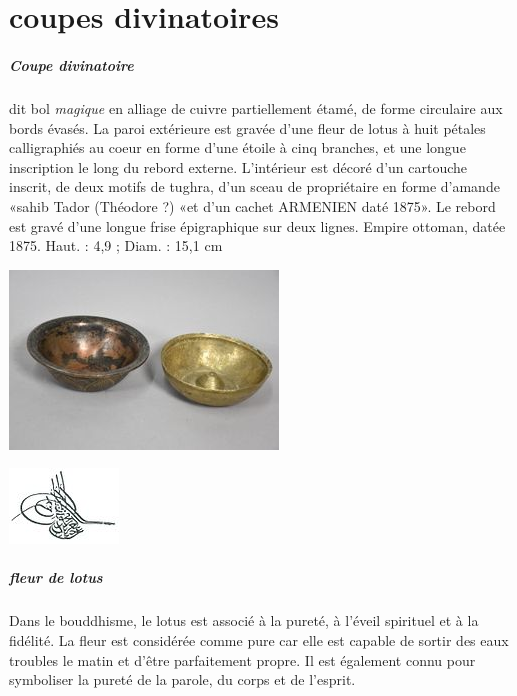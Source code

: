 \chapter{coupes divinatoires}


\paragraph{Coupe divinatoire} dit bol \textit{magique} en alliage de cuivre partiellement étamé, de forme circulaire aux bords évasés. La paroi extérieure est gravée d'une fleur de lotus à huit pétales calligraphiés au coeur en forme d'une étoile à cinq branches, et une longue inscription le long du rebord externe. L'intérieur est décoré d'un cartouche inscrit, de deux motifs de tughra, d'un sceau de propriétaire en forme d'amande «sahib Tador (Théodore ?) «et d'un cachet ARMENIEN daté 1875». Le rebord est gravé d'une longue frise épigraphique sur deux lignes. Empire ottoman, datée 1875.
Haut. : 4,9 ; Diam. : 15,1 cm

\includegraphics[width=\textwidth]{GénéralISTR/Image/bolsmagiques.jpeg}

\includegraphics[]{GénéralISTR/Image/Tughra_of_Abdülaziz 1861-76.jpeg}

\paragraph{fleur de lotus} Dans le bouddhisme, le lotus est associé à la pureté, à l’éveil spirituel et à la fidélité. La fleur est considérée comme pure car elle est capable de sortir des eaux troubles le matin et d’être parfaitement propre. Il est également connu pour symboliser la pureté de la parole, du corps et de l’esprit.


